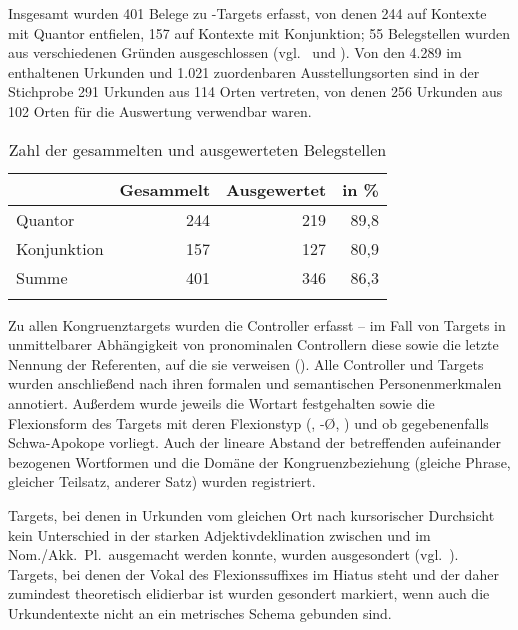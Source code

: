 \label{phsec:caohiatus}
Insgesamt wurden 401 Belege zu -Targets erfasst, von denen 244 auf
Kontexte mit Quantor entfielen, 157 auf Kontexte mit Konjunktion; 55
Belegstellen wurden aus verschiedenen Gründen ausgeschlossen
(vgl.~ und ). Von den 4.289 im
\CAO{} enthaltenen Urkunden und 1.021 zuordenbaren Ausstellungsorten sind in
der Stichprobe 291 Urkunden aus 114 Orten vertreten, von denen 256 Urkunden aus
102 Orten für die Auswertung verwendbar waren.

\begin{table}
\centering
\caption{Zahl der gesammelten und ausgewerteten Belegstellen}
\begin{tabular}{l r r r}
\lsptoprule

%
	& Gesammelt
	& Ausgewertet
	& in \%
	\\

\midrule


Quantor
	& 244 %
	& 219 %
	& 89,8 %
	\\

Konjunktion
	& 157 %
	& 127 %
	& 80,9 %
	\\

\midrule

Summe
	& 401 %
	& 346 %
	& 86,3 %
	\\

\lspbottomrule
\end{tabular}
\label{tab:ausgewcao}
\end{table}

Zu allen Kongruenztargets wurden die Controller erfasst -- im Fall von Targets
in unmittelbarer Abhängigkeit von pronominalen Controllern diese sowie die
letzte Nennung der Referenten, auf die sie verweisen (). Alle
Controller und Targets wurden anschließend nach ihren formalen und semantischen
Personenmerkmalen annotiert. Außerdem wurde jeweils die Wortart festgehalten
sowie die Flexionsform des Targets mit deren Flexionstyp (, -Ø,
) und ob gegebenenfalls Schwa-Apokope vorliegt. Auch der lineare
Abstand der betreffenden aufeinander bezogenen Wortformen und die Domäne der
Kongruenzbeziehung (gleiche Phrase, gleicher Teilsatz, anderer Satz) wurden
registriert.

Targets, bei denen in Urkunden vom gleichen Ort nach kursorischer Durchsicht
kein Unterschied in der starken Adjektivdeklination zwischen  und
 im Nom./Akk.~Pl.\ ausgemacht werden konnte, wurden ausgesondert
(vgl.~). Targets, bei denen der Vokal des Flexionssuffixes
im Hiatus steht und der daher zumindest theoretisch elidierbar ist
\autocites[vgl.][90--91]{askedal1973}[191]{gjelsten1980} wurden gesondert
markiert, wenn auch die Urkundentexte nicht an ein metrisches Schema gebunden
sind.

